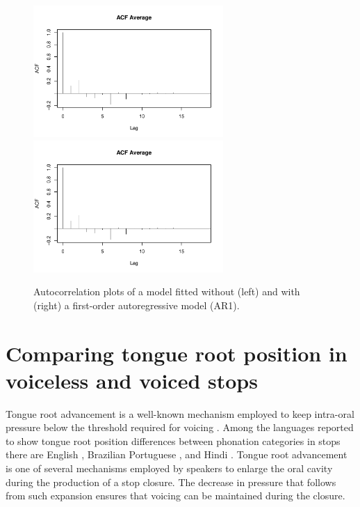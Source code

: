 \documentclass[11pt,]{article}
\begin{document}
\begin{figure}

{\centering \includegraphics[width=.7\linewidth,height=5cm]{2018-polar-gam_files/figure-latex/Figure05} \includegraphics[width=.7\linewidth,height=5cm]{2018-polar-gam_files/figure-latex/Figure05} 

}

\caption{Autocorrelation plots of a model fitted without (left) and with (right) a first-order autoregressive model (AR1).}\label{f:Figure05}
\end{figure}

\hypertarget{comparing-tongue-root-position-in-voiceless-and-voiced-stops}{%
\section{Comparing tongue root position in voiceless and voiced
stops}\label{comparing-tongue-root-position-in-voiceless-and-voiced-stops}}

Tongue root advancement is a well-known mechanism employed to keep
intra-oral pressure below the threshold required for voicing
\citep{ohala2011, kent1969, perkell1969, westbury1983, ahn2018}. Among
the languages reported to show tongue root position differences between
phonation categories in stops there are English
\citep{westbury1983, ahn2018}, Brazilian Portuguese \citep{ahn2018}, and
Hindi \citep{ahn2016a}. Tongue root advancement is one of several
mechanisms employed by speakers to enlarge the oral cavity during the
production of a stop closure. The decrease in pressure that follows from
such expansion ensures that voicing can be maintained during the
closure.
\end{document}
